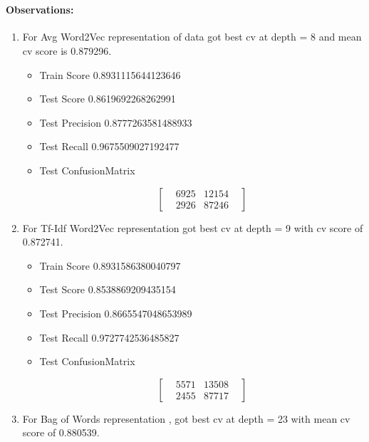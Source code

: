 \documentclass[11pt]{article}
\providecommand{\tightlist}{%
      \setlength{\itemsep}{0pt}\setlength{\parskip}{0pt}}
\begin{document}
    \begin{center}
    \end{center}
    { \hspace*{\fill} \\}
    
    \paragraph{\texorpdfstring{Observations:}{Observations: }}\label{observations}

\begin{enumerate}
\def\labelenumi{\arabic{enumi}.}
\tightlist
\item
  For Avg Word2Vec representation of data got best cv at depth = 8 and
  mean cv score is 0.879296.

  \begin{itemize}
  \tightlist
  \item
    Train Score 0.8931115644123646
  \item
    Test Score 0.8619692268262991
  \item
    Test Precision 0.8777263581488933
  \item
    Test Recall 0.9675509027192477
  \item
    Test ConfusionMatrix

    \begin{equation}
    \begin{bmatrix}
    & 6925 & 12154 &  \\
    & 2926 & 87246 & 
    \end{bmatrix}
    \end{equation}
  \end{itemize}
\item
  For Tf-Idf Word2Vec representation got best cv at depth = 9 with cv
  score of 0.872741.

  \begin{itemize}
  \tightlist
  \item
    Train Score 0.8931586380040797
  \item
    Test Score 0.8538869209435154
  \item
    Test Precision 0.8665547048653989
  \item
    Test Recall 0.9727742536485827
  \item
    Test ConfusionMatrix

    \begin{equation}
    \begin{bmatrix}
    & 5571 & 13508 &  \\
    & 2455 & 87717 & 
    \end{bmatrix}
    \end{equation}
  \end{itemize}
\item
  For Bag of Words representation , got best cv at depth = 23 with mean
  cv score of 0.880539.


\end{enumerate}
\end{document}
